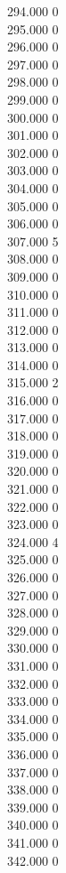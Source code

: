 { 294.000	0 \\
 295.000	0 \\
 296.000	0 \\
 297.000	0 \\
 298.000	0 \\
 299.000	0 \\
 300.000	0 \\
 301.000	0 \\
 302.000	0 \\
 303.000	0 \\
 304.000	0 \\
 305.000	0 \\
 306.000	0 \\
 307.000	5 \\
 308.000	0 \\
 309.000	0 \\
 310.000	0 \\
 311.000	0 \\
 312.000	0 \\
 313.000	0 \\
 314.000	0 \\
 315.000	2 \\
 316.000	0 \\
 317.000	0 \\
 318.000	0 \\
 319.000	0 \\
 320.000	0 \\
 321.000	0 \\
 322.000	0 \\
 323.000	0 \\
 324.000	4 \\
 325.000	0 \\
 326.000	0 \\
 327.000	0 \\
 328.000	0 \\
 329.000	0 \\
 330.000	0 \\
 331.000	0 \\
 332.000	0 \\
 333.000	0 \\
 334.000	0 \\
 335.000	0 \\
 336.000	0 \\
 337.000	0 \\
 338.000	0 \\
 339.000	0 \\
 340.000	0 \\
 341.000	0 \\
 342.000	0 \\
}
